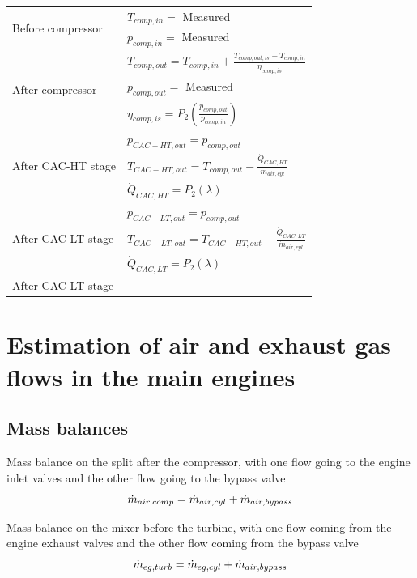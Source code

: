 \documentclass[preprint,12pt]{elsarticle}
\begin{document}
\begin{table}[htbp]
	\centering
	\begin{tabular}{p{4cm}l}
		\hline
		\multirow{2}{*}{Before compressor}		& $ T_{comp,in} = $ Measured \\
												& $ p_{comp,in} = $ Measured \\
		\multirow{3}{*}{After compressor}		& $ T_{comp,out} = T_{comp,in} + \frac{T_{comp,out,is} - T_{comp,in} }{\eta_{comp,is}}  $  \\
												& $ p_{comp,out} = $ Measured \\
												& $ \eta_{comp,is} = P_2(\frac{p_{comp,out}}{p_{comp,in}}) $ \\
		\multirow{3}{*}{After CAC-HT stage}		& $ p_{CAC-HT,out} = p_{comp,out} $ \\
												& $ T_{CAC-HT,out} = T_{comp,out} - \frac{\dot{Q}_{CAC,HT}}{\dot{m}_{air,cyl}} $ \\
												& $ \dot{Q}_{CAC,HT} = P_2(\lambda) $ \\
		\multirow{3}{*}{After CAC-LT stage}		& $ p_{CAC-LT,out} = p_{comp,out} $ \\
												& $ T_{CAC-LT,out} = T_{CAC-HT,out} - \frac{\dot{Q}_{CAC,LT}}{\dot{m}_{air,cyl}} $ \\
												& $ \dot{Q}_{CAC,LT} = P_2(\lambda) $ \\
		\multirow{3}{*}{After CAC-LT stage}											
												
												
	\end{tabular}
\end{table}

\section{Estimation of air and exhaust gas flows in the main engines}

\subsection{Mass balances}

Mass balance on the split after the compressor, with one flow going to the engine inlet valves and the other flow going to the bypass valve
\begin{equation}
\dot{m}_{air,comp} = \dot{m}_{air,cyl} + \dot{m}_{air,bypass} \\
\end{equation}

Mass balance on the mixer before the turbine, with one flow coming from the engine exhaust valves and the other flow coming from the bypass valve
\begin{equation}
\dot{m}_{eg,turb} = \dot{m}_{eg,cyl} + \dot{m}_{air,bypass} \\
\end{equation}
\end{document}
